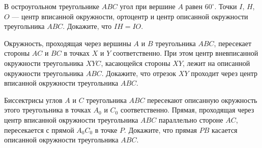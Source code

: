 \documentclass{article}
\begin{document}
\begin{enumerate_boxed}
        \item В остроугольном треугольнике $ABC$ угол при вершине $A$ равен $60^{\circ}$.
        Точки $I$, $H$, $O$ --- центр вписанной окружности, ортоцентр и центр описанной окружности треугольника $ABC$.
        Докажите, что $IH = IO$.

        \item Окружность, проходящая через вершины $A$ и $B$ треугольника $ABC$, пересекает стороны $AC$ и $BC$ в точках $X$ и $Y$ соответственно.
        При этом центр вневписанной окружности треугольника $XYC$, касающейся стороны $XY$, лежит на описанной окружности треугольника $ABC$.
        Докажите, что отрезок $XY$ проходит через центр вписанной окружности треугольника $ABC$.

        \item Биссектрисы углов $A$ и $C$ треугольника $ABC$ пересекают описанную окружность этого треугольника в точках $A_0$ и $C_0$ соответственно.
        Прямая, проходящая через центр вписанной окружности треугольника $ABC$ параллельно стороне $AC$, пересекается с прямой $A_{0}C_0$ в точке $P$.
        Докажите, что прямая $PB$ касается описанной окружности треугольника $ABC$.

    \end{enumerate_boxed}
\end{document}
